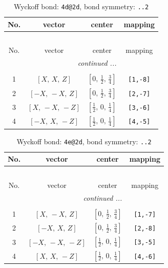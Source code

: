 \documentclass[fleqn,8pt]{jsarticle}
\begin{document}
\begin{longtable}{cccc}
\caption{Wyckoff bond: {\tt 4d@2d}, bond symmetry: {\tt ..2}}
 \\
 \hline \hline
No. & vector & center & mapping \\ \hline \endfirsthead

\multicolumn{3}{l}{\tablename\ \thetable{}} \\
 \hline \hline
No. & vector & center & mapping \\ \hline \endhead

 \hline \hline
\multicolumn{3}{r}{\footnotesize\it continued ...} \\ \endfoot

 \hline \hline
\multicolumn{3}{r}{} \\ \endlastfoot

1 & $\left[ X,\, X,\, Z \right]$ & $\left[ 0,\, \frac{1}{2},\, \frac{3}{4} \right]$ & {\tt [1,-8]} \\ \hline
2 & $\left[ - X,\, - X,\, Z \right]$ & $\left[ 0,\, \frac{1}{2},\, \frac{3}{4} \right]$ & {\tt [2,-7]} \\ \hline
3 & $\left[ X,\, - X,\, - Z \right]$ & $\left[ \frac{1}{2},\, 0,\, \frac{1}{4} \right]$ & {\tt [3,-6]} \\ \hline
4 & $\left[ - X,\, X,\, - Z \right]$ & $\left[ \frac{1}{2},\, 0,\, \frac{1}{4} \right]$ & {\tt [4,-5]} \\
\end{longtable}
\renewcommand{\arraystretch}{1.2}
\begin{longtable}{cccc}
\caption{Wyckoff bond: {\tt 4e@2d}, bond symmetry: {\tt ..2}}
 \\
 \hline \hline
No. & vector & center & mapping \\ \hline \endfirsthead

\multicolumn{3}{l}{\tablename\ \thetable{}} \\
 \hline \hline
No. & vector & center & mapping \\ \hline \endhead

 \hline \hline
\multicolumn{3}{r}{\footnotesize\it continued ...} \\ \endfoot

 \hline \hline
\multicolumn{3}{r}{} \\ \endlastfoot

1 & $\left[ X,\, - X,\, Z \right]$ & $\left[ 0,\, \frac{1}{2},\, \frac{3}{4} \right]$ & {\tt [1,-7]} \\ \hline
2 & $\left[ - X,\, X,\, Z \right]$ & $\left[ 0,\, \frac{1}{2},\, \frac{3}{4} \right]$ & {\tt [2,-8]} \\ \hline
3 & $\left[ - X,\, - X,\, - Z \right]$ & $\left[ \frac{1}{2},\, 0,\, \frac{1}{4} \right]$ & {\tt [3,-5]} \\ \hline
4 & $\left[ X,\, X,\, - Z \right]$ & $\left[ \frac{1}{2},\, 0,\, \frac{1}{4} \right]$ & {\tt [4,-6]} \\
\end{longtable}
\end{document}

